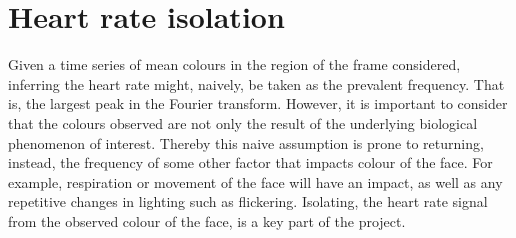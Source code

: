














\section{Heart rate isolation}
Given a time series of mean colours in the region of the frame considered, inferring the heart rate might, naively, be taken as the prevalent frequency. That is, the largest peak in the Fourier transform. However, it is important to consider that the colours observed are not only the result of the underlying biological phenomenon of interest. Thereby this naive assumption is prone to returning, instead, the frequency of some other factor that impacts colour of the face. For example, respiration or movement of the face will have an impact, as well as any repetitive changes in lighting such as flickering. Isolating, the heart rate signal from the observed colour of the face, is a key part of the project.


